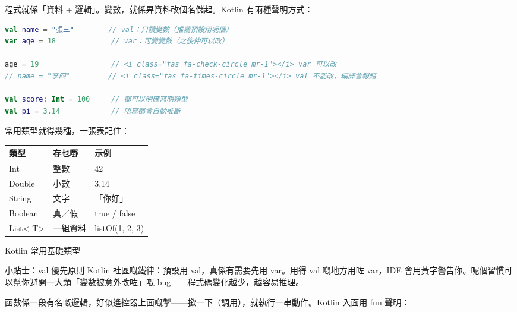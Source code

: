 


程式就係「資料 + 邏輯」。變數，就係畀資料改個名儲起。Kotlin 有兩種聲明方式：

\begin{lstlisting}[language=Kotlin]
val name = "張三"        // val：只讀變數（推薦預設用呢個）
var age = 18             // var：可變變數（之後仲可以改）

age = 19                 // <i class="fas fa-check-circle mr-1"></i> var 可以改
// name = "李四"         // <i class="fas fa-times-circle mr-1"></i> val 不能改，編譯會報錯

val score: Int = 100     // 都可以明確寫明類型
val pi = 3.14            // 唔寫都會自動推斷
\end{lstlisting}

常用類型就得幾種，一張表記住：

\begin{center}
\begin{tabularx}{\linewidth}{|X|X|X|}
\hline
\textbf{類型} & \textbf{存乜嘢} & \textbf{示例} \tabularnewline
\hline
Int & 整數 & 42 \tabularnewline
Double & 小數 & 3.14 \tabularnewline
String & 文字 & 「你好」 \tabularnewline
Boolean & 真／假 & true / false \tabularnewline
List< T> & 一組資料 & listOf(1, 2, 3) \tabularnewline
\hline
\end{tabularx}
\end{center}

\begin{center}\small\color{gray}Kotlin 常用基礎類型\end{center}

\begin{tcbinfo}{小貼士：val 優先原則}
Kotlin 社區嘅鐵律：預設用 val，真係有需要先用 var。用得 val 嘅地方用咗 var，IDE 會用黃字警告你。呢個習慣可以幫你避開一大類「變數被意外改咗」嘅 bug——程式碼變化越少，越容易推理。

\end{tcbinfo}


函數係一段有名嘅邏輯，好似遙控器上面嘅掣——撳一下（調用），就執行一串動作。Kotlin 入面用 fun 聲明：

